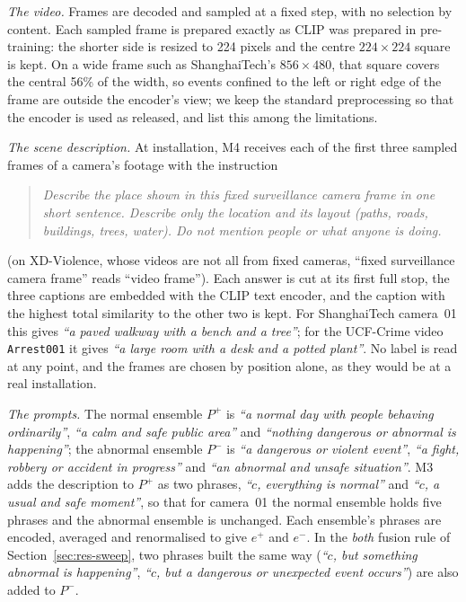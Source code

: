 \documentclass[a4paper,fleqn]{cas-sc}
\begin{document}
\emph{The video.} Frames are decoded and sampled at a fixed step, with no
selection by content. Each sampled frame is prepared exactly as CLIP was
prepared in pre-training: the shorter side is resized to 224 pixels and the
centre $224\times224$ square is kept. On a wide frame such as ShanghaiTech's
$856\times480$, that square covers the central 56\% of the width, so events
confined to the left or right edge of the frame are outside the encoder's view;
we keep the standard preprocessing so that the encoder is used as released, and
list this among the limitations.

\emph{The scene description.} At installation, M4 receives each of the first
three sampled frames of a camera's footage with the instruction
\begin{quote}\small
\emph{Describe the place shown in this fixed surveillance camera frame in one
short sentence. Describe only the location and its layout (paths, roads,
buildings, trees, water). Do not mention people or what anyone is doing.}
\end{quote}
(on XD-Violence, whose videos are not all from fixed cameras, ``fixed
surveillance camera frame'' reads ``video frame''). Each answer is cut at its
first full stop, the three captions are embedded with the CLIP text encoder, and
the caption with the highest total similarity to the other two is kept. For
ShanghaiTech camera~01 this gives \emph{``a paved walkway with a bench and a
tree''}; for the UCF-Crime video \texttt{Arrest001} it gives \emph{``a large
room with a desk and a potted plant''}. No label is read at any point, and the
frames are chosen by position alone, as they would be at a real installation.

\emph{The prompts.} The normal ensemble $P^{+}$ is \emph{``a normal day with
people behaving ordinarily''}, \emph{``a calm and safe public area''} and
\emph{``nothing dangerous or abnormal is happening''}; the abnormal ensemble
$P^{-}$ is \emph{``a dangerous or violent event''}, \emph{``a fight, robbery or
accident in progress''} and \emph{``an abnormal and unsafe situation''}. M3 adds
the description to $P^{+}$ as two phrases, \emph{``$c$, everything is normal''}
and \emph{``$c$, a usual and safe moment''}, so that for camera~01 the normal
ensemble holds five phrases and the abnormal ensemble is unchanged. Each
ensemble's phrases are encoded, averaged and renormalised to give $e^{+}$ and
$e^{-}$. In the \emph{both} fusion rule of Section~\ref{sec:res-sweep}, two
phrases built the same way (\emph{``$c$, but something abnormal is
happening''}, \emph{``$c$, but a dangerous or unexpected event occurs''}) are
also added to $P^{-}$.
\end{document}
